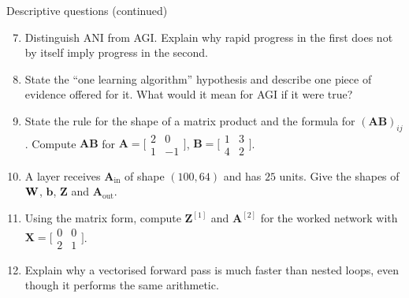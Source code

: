 \documentclass[aspectratio=169,10pt]{beamer}
\begin{document}
\begin{frame}{Descriptive questions (continued)}
  \footnotesize
  \begin{enumerate}\setcounter{enumi}{6}
    \item Distinguish ANI from AGI. Explain why rapid progress in the first does not by
          itself imply progress in the second. \hfill{}
    \item State the ``one learning algorithm'' hypothesis and describe one piece of evidence
          offered for it. What would it mean for AGI if it were true? \hfill{}
    \item State the rule for the shape of a matrix product and the formula for
          $(\mathbf{AB})_{ij}$. Compute $\mathbf{AB}$ for
          $\mathbf{A}=\bigl[\begin{smallmatrix}2&0\\1&-1\end{smallmatrix}\bigr]$,
          $\mathbf{B}=\bigl[\begin{smallmatrix}1&3\\4&2\end{smallmatrix}\bigr]$. \hfill{}
    \item A layer receives $\mathbf{A}_{\text{in}}$ of shape $(100, 64)$ and has $25$ units.
          Give the shapes of $\mathbf{W}$, $\mathbf{b}$, $\mathbf{Z}$ and $\mathbf{A}_{\text{out}}$.
          \hfill{}
    \item Using the matrix form, compute $\mathbf{Z}^{[1]}$ and $\mathbf{A}^{[2]}$ for the
          worked network with $\mathbf{X}=\bigl[\begin{smallmatrix}0&0\\2&1\end{smallmatrix}
          \bigr]$. \hfill{}
    \item Explain why a vectorised forward pass is much faster than nested loops, even
          though it performs the same arithmetic. \hfill{}
  \end{enumerate}
\end{frame}
\end{document}
